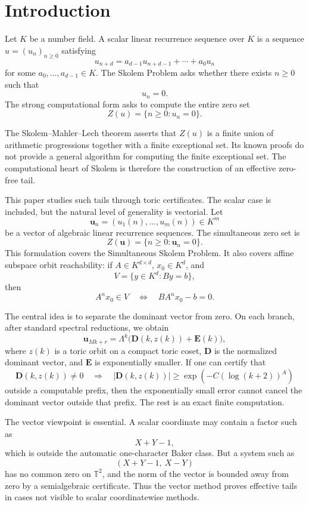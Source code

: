\documentclass[11pt]{article}
\newcommand{\T}{\mathbb T}
\begin{document}
\section{Introduction}

Let \(K\) be a number field. A scalar linear recurrence sequence over \(K\) is a sequence \(u=(u_n)_{n\ge0}\) satisfying
\[
u_{n+d}=a_{d-1}u_{n+d-1}+\cdots+a_0u_n
\]
for some \(a_0,\ldots,a_{d-1}\in K\). The Skolem Problem asks whether there exists \(n\ge0\) such that
\[
u_n=0.
\]
The strong computational form asks to compute the entire zero set
\[
Z(u)=\{n\ge0:u_n=0\}.
\]

The Skolem--Mahler--Lech theorem asserts that \(Z(u)\) is a finite union of arithmetic progressions together with a finite exceptional set. Its known proofs do not provide a general algorithm for computing the finite exceptional set. The computational heart of Skolem is therefore the construction of an effective zero-free tail.

This paper studies such tails through toric certificates. The scalar case is included, but the natural level of generality is vectorial. Let
\[
\mathbf u_n=(u_1(n),\ldots,u_m(n))\in K^m
\]
be a vector of algebraic linear recurrence sequences. The simultaneous zero set is
\[
Z(\mathbf u)=\{n\ge0:\mathbf u_n=0\}.
\]
This formulation covers the Simultaneous Skolem Problem. It also covers affine subspace orbit reachability: if \(A\in K^{d\times d}\), \(x_0\in K^d\), and
\[
V=\{y\in K^d:By=b\},
\]
then
\[
A^n x_0\in V
\quad\Longleftrightarrow\quad
BA^n x_0-b=0.
\]

The central idea is to separate the dominant vector from zero. On each branch, after standard spectral reductions, we obtain
\[
\mathbf u_{Mk+r}
=
\Lambda^k\bigl(\mathbf D(k,z(k))+\mathbf E(k)\bigr),
\]
where \(z(k)\) is a toric orbit on a compact toric coset, \(\mathbf D\) is the normalized dominant vector, and \(\mathbf E\) is exponentially smaller. If one can certify that
\[
\mathbf D(k,z(k))\ne0
\quad\Longrightarrow\quad
|\mathbf D(k,z(k))|
\ge
\exp(-C(\log(k+2))^A)
\]
outside a computable prefix, then the exponentially small error cannot cancel the dominant vector outside that prefix. The rest is an exact finite computation.

The vector viewpoint is essential. A scalar coordinate may contain a factor such as
\[
X+Y-1,
\]
which is outside the automatic one-character Baker class. But a system such as
\[
(X+Y-1,\ X-Y)
\]
has no common zero on \(\T^2\), and the norm of the vector is bounded away from zero by a semialgebraic certificate. Thus the vector method proves effective tails in cases not visible to scalar coordinatewise methods.
\end{document}
